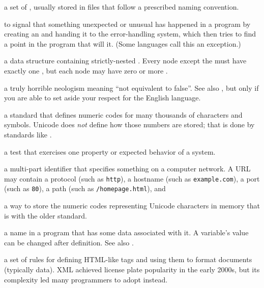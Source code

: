 \begin{description}
a set of , usually stored in files that follow a
prescribed naming convention.

to signal that something unexpected or unusual has happened in a program by
creating an  and handing it to the error-handling
system, which then tries to find a point in the program that will
 it. (Some languages call this \emph{} an
exception.)

a data structure containing strictly-nested . Every node
except the  must have exactly one , but each node may have zero or more
.

a truly horrible neologism meaning ``not equivalent to false''. See also
, but only if you are able to set aside your respect for the
English language.

a standard that defines numeric codes for many thousands of characters and
symbols. Unicode does \emph{not} define how those numbers are stored; that is done
by standards like .

a test that exercises one property or expected behavior of a system.

a multi-part identifier that specifies something on a computer network. A URL
may contain a protocol (such as \texttt{http}), a hostname (such as \texttt{example.com}), a
port (such as \texttt{80}), a path (such as \texttt{/homepage.html}), and 

a way to store the numeric codes representing Unicode characters in memory
that is  with the older
 standard.

a name in a program that has some data associated with it. A variable's value
can be changed after definition. See also .

a set of rules for defining HTML-like tags and using them to format documents
(typically data). XML achieved license plate popularity in the early 2000s,
but its complexity led many programmers to adopt  instead.

\end{description}
